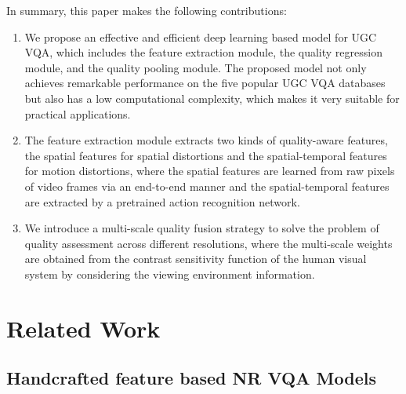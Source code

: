 \documentclass[sigconf]{acmart}
\begin{document}
In summary, this paper makes the following contributions:
\begin{enumerate}
	\item We propose an effective and efficient deep learning based model for UGC VQA, which includes the feature extraction module, the quality regression module, and the quality pooling module. The proposed model not only achieves remarkable performance on the five popular UGC VQA databases but also has a low computational complexity, which makes it very suitable for practical applications.
	\item The feature extraction module extracts two kinds of quality-aware features, the spatial features for spatial distortions and the spatial-temporal features for motion distortions, where the spatial features are learned from raw pixels of video frames via an end-to-end manner and the spatial-temporal features are extracted by a pretrained action recognition network. 
	\item We introduce a multi-scale quality fusion strategy to solve the problem of quality assessment across different resolutions, where the multi-scale weights are obtained from the contrast sensitivity function of the human visual system by considering the viewing environment information.
\end{enumerate}




\section{Related Work}
\label{related_work}
\subsection{Handcrafted feature based NR VQA Models}
\end{document}

